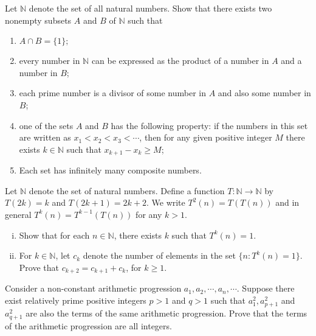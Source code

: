 \documentclass[problems.tex]{subfile}
\begin{document}
	
	\begin{problem}
		Let $\mathbb N$ denote the set of all natural numbers. Show that there exists two nonempty subsets $A$ and $B$ of $\mathbb N$ such that
		\begin{enumerate}
			\item $A\cap B=\{1\};$
			\item every number in $\mathbb N$ can be expressed as the product of a number in $A$ and a number in $B$;
			\item each prime number is a divisor of some number in $A$ and also some number in $B$;
			\item one of the sets $A$ and $B$ has the following property: if the numbers in this set are written as $x_1<x_2<x_3<\cdots$, then for any given positive integer $M$ there exists $k\in \mathbb N$ such that $x_{k+1}-x_k\ge M$;
			\item Each set has infinitely many composite numbers.
		\end{enumerate}
	\end{problem}
	
	
	
	
	\begin{problem}
		Let $\mathbb{N}$ denote the set of natural numbers. Define a function $T:\mathbb{N}\rightarrow\mathbb{N}$ by $T(2k)=k$ and $T(2k+1)=2k+2$. We write $T^2(n)=T(T(n))$ and in general $T^k(n)=T^{k-1}(T(n))$ for any $k>1$.
		\begin{enumerate}[(i)]
			\item Show that for each $n\in\mathbb{N}$, there exists $k$ such that $T^k(n)=1$.
			\item For $k\in\mathbb{N}$, let $c_k$ denote the number of elements in the set $\{n: T^k(n)=1\}$. Prove that $c_{k+2}=c_{k+1}+c_k$, for $k\ge 1$.
		\end{enumerate}
	\end{problem}
	
	
	
	
	
	\begin{problem}
		Consider a non-constant arithmetic progression $a_1, a_2,\cdots, a_n,\cdots$. Suppose there exist relatively prime positive integers $p>1$ and $q>1$ such that $a_1^2, a_{p+1}^2$ and $a_{q+1}^2$ are also the terms of the same arithmetic progression. Prove that the terms of the arithmetic progression are all integers. %
	\end{problem}
	
\end{document}
